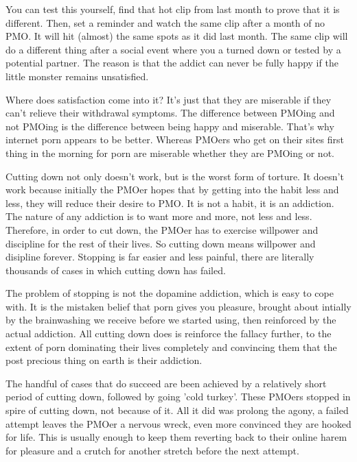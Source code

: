 \documentclass[easypeasy.tex]{subfiles}
\begin{document}
You can test this yourself, find that hot clip from last month to prove that it is different. Then, set a reminder and watch the same clip after a month of no PMO. It will hit (almost) the same spots as it did last month. The same clip will do a different thing after a social event where you a turned down or tested by a potential partner. The reason is that the addict can never be fully happy if the little monster remains unsatisfied.

Where does satisfaction come into it? It's just that they are miserable if they can't relieve their withdrawal symptoms. The difference between PMOing and not PMOing is the difference between being happy and miserable. That's why internet porn appears to be better. Whereas PMOers who get on their sites first thing in the morning for porn are miserable whether they are PMOing or not.

Cutting down not only doesn't work, but is the worst form of torture. It doesn't work because initially the PMOer hopes that by getting into the habit less and less, they will reduce their desire to PMO. It is not a habit, it is an addiction. The nature of any addiction is to want more and more, not less and less. Therefore, in order to cut down, the PMOer has to exercise willpower and discipline for the rest of their lives. So cutting down means willpower and disipline forever. Stopping is far easier and less painful, there are literally thousands of cases in which cutting down has failed.

The problem of stopping is not the dopamine addiction, which is easy to cope with. It is the mistaken belief that porn gives you pleasure, brought about intially by the brainwashing we receive before we started using, then reinforced by the actual addiction. All cutting down does is reinforce the fallacy further, to the extent of porn dominating their lives completely and convincing them that the post precious thing on earth is their addiction.

The handful of cases that do succeed are been achieved by a relatively short period of cutting down, followed by going 'cold turkey'. These PMOers stopped in spire of cutting down, not because of it. All it did was prolong the agony, a failed attempt leaves the PMOer a nervous wreck, even more convinced they are hooked for life. This is usually enough to keep them reverting back to their online harem for pleasure and a crutch for another stretch before the next attempt.
\end{document}
